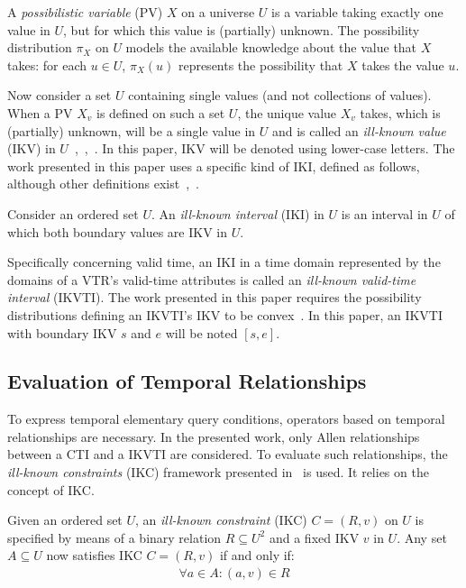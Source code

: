 \documentclass[runningheads,a4paper]{llncs}
\begin{document}
\begin{definition}
\label{def:poss-variable}
A \emph{possibilistic variable} (PV) $X$ on a universe $U$ is a variable taking exactly one value in $U$, but for which this value is (partially) unknown. The possibility distribution $\pi_X$ on $U$ models the available knowledge about the value that $X$ takes: for each $u \in U$, $\pi_X(u)$ represents the possibility that $X$ takes the value $u$.
\end{definition}

Now consider a set $U$ containing single values (and not collections of values). When a PV $X_{v}$ is defined on such a set $U$, the unique value $X_{v}$ takes, which is (partially) unknown, will be a single value in $U$ and is called an \emph{ill-known value} (IKV) in $U$~\cite{Billiet2012ipmu},~\cite{Pons2013ijufkbs},~\cite{Dubois1988cma}. In this paper, IKV will be denoted using lower-case letters. The work presented in this paper uses a specific kind of IKI, defined as follows, although other definitions exist~\cite{Billiet2012ipmu},~\cite{Pons2012ipmu}.

\begin{definition}
Consider an ordered set $U$. An \emph{ill-known interval} (IKI) in $U$ is an interval in $U$ of which both boundary values are IKV in $U$.
\end{definition}

Specifically concerning valid time, an IKI in a time domain represented by the domains of a VTR's valid-time attributes is called an \emph{ill-known valid-time interval} (IKVTI). The work presented in this paper requires the possibility distributions defining an IKVTI's IKV to be convex~\cite{Pons2013ijufkbs}. In this paper, an IKVTI with boundary IKV $s$ and $e$ will be noted $\left[s, e\right]$.

\subsection{Evaluation of Temporal Relationships}
To express temporal elementary query conditions, operators based on temporal relationships are necessary. In the presented work, only Allen relationships~\cite{Allen1983cacm} between a CTI and a IKVTI are considered. To evaluate such relationships, the \emph{ill-known constraints} (IKC) framework presented in~\cite{Pons2013ijufkbs} is used. It relies on the concept of IKC.

\begin{definition}
Given an ordered set $U$, an \emph{ill-known constraint} (IKC) $C = (R,v)$ on $U$ is specified by means of a binary relation $R \subseteq U^{2}$ and a fixed IKV $v$ in $U$. Any set $A \subseteq U$ now satisfies IKC $C = (R,v)$ if and only if:
\begin{align}
\forall a \in A : (a,v) \in R \nonumber
\end{align}
\end{definition}
\end{document}
